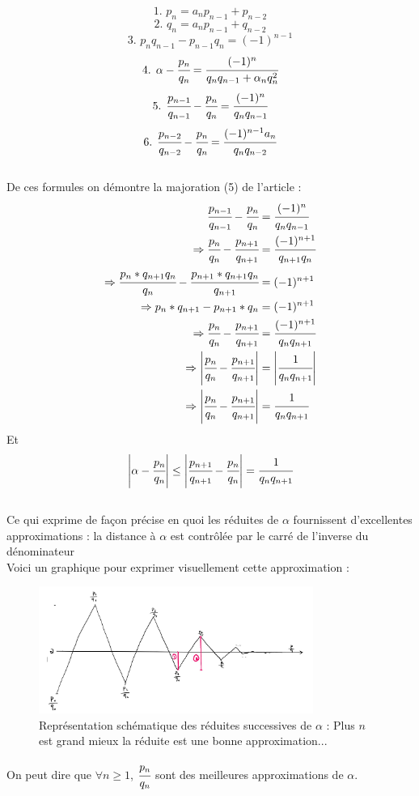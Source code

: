 \documentclass[moyen]{classeUPD}
\begin{document}
$$\text{1. }p_{n}=a_{n}p_{n-1}+p_{n-2}$$
$$\text{2. }q_{n}=a_{n}p_{n-1}+q_{n-2}$$
$$\text{3. } p_{n}q_{n-1}-p_{n-1}q_{n}=(-1)^{n-1}$$
$$\text{4. }\alpha - \cfrac{p_{n}}{q_{n}} = \cfrac{(-1)^{n}}{q_{n}q_{n-1}+\alpha_{n}q_{n}^{2}}$$
$$\text{5. }\cfrac{p_{n-1}}{q_{n-1}}-\cfrac{p_{n}}{q_{n}}= \cfrac{(-1)^{n}}{q_{n}q_{n-1}}$$
$$\text{6. }\cfrac{p_{n-2}}{q_{n-2}}-\cfrac{p_{n}}{q_{n}}= \cfrac{(-1)^{n-1}a_{n}}{q_{n}q_{n-2}}$$\\

De ces formules on démontre la majoration (5) de l’article :\\

\begin{align*}
	\cfrac{p_{n-1}}{q_{n-1}}-\cfrac{p_{n}}{q_{n}}&= \cfrac{(-1)^{n}}{q_{n}q_{n-1}}\\
	\Rightarrow\cfrac{p_{n}}{q_{n}}-\cfrac{p_{n+1}}{q_{n+1}}&= \cfrac{(-1)^{n+1}}{q_{n+1}q_{n}}\\
	\Rightarrow\cfrac{p_{n}*q_{n+1}q_{n}}{q_{n}}-\cfrac{p_{n+1}*q_{n+1}q_{n}}{q_{n+1}}&= (-1)^{n+1}\\
	\Rightarrow p_{n}*q_{n+1}-p_{n+1}*q_{n}&= (-1)^{n+1}\\
	\Rightarrow\cfrac{p_{n}}{q_{n}}-\cfrac{p_{n+1}}{q_{n+1}}&=\cfrac{(-1)^{n+1}}{q_{n}q_{n+1}}\\
	\Rightarrow\left|\cfrac{p_{n}}{q_{n}}-\cfrac{p_{n+1}}{q_{n+1}}\right|&=\left|\cfrac{1}{q_{n}q_{n+1}}\right|\\
	\Rightarrow\left|\cfrac{p_{n}}{q_{n}}-\cfrac{p_{n+1}}{q_{n+1}}\right|&=\cfrac{1}{q_{n}q_{n+1}}
\end{align*}
Et
$$\left|\alpha-\cfrac{p_{n}}{q_{n}}\right| \le \left|\cfrac{p_{n+1}}{q_{n+1}}-\cfrac{p_{n}}{q_{n}}\right|=\cfrac{1}{q_{n}q_{n+1}}$$\\

Ce qui exprime de façon précise en quoi les réduites de $\alpha$ fournissent d'excellentes approximations : la distance à $\alpha$ est contrôlée par le carré de l'inverse du dénominateur\\

Voici un graphique pour exprimer visuellement cette approximation :\\

\begin{figure}[h!]
	\begin{center}
		\includegraphics[width=0.8\textwidth]{SnipImage[992].jpg}
		\caption{Représentation schématique des réduites successives de $\alpha$ : Plus $n$ est grand mieux la réduite est une bonne approximation...}
		\label{figure 5}
	\end{center}
\end{figure}
 On peut dire que $\forall n \geq 1 $, $\cfrac{p_{n}}{q_{n}}$ sont des meilleures approximations de $\alpha$.
\end{document}
